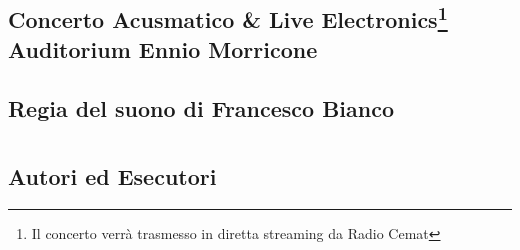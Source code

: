 \documentclass[8pt, twoside, a5paper]{extreport}
\begin{document}
\subsection*{{\small Concerto Acusmatico \& Live Electronics\footnote{ Il concerto verrà trasmesso in diretta streaming da Radio Cemat}} \\
	\textsf{Auditorium Ennio Morricone}}

{\fontsize{30}{30} }

\subsection*{\textsf{Regia del suono di Francesco Bianco}}

\bigskip

\begin{multicols}{2}




\end{multicols}

\clearpage





\section*{ }

\subsection*{\textsf{Autori ed Esecutori}\\}

{\fontsize{30}{30} }

\bigskip
\end{document}
